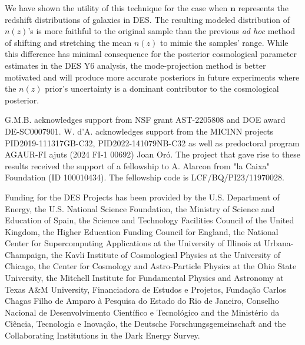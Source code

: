 \documentclass[linenumbers, onecolumn]{aastex63}
\newcommand{\vecn}{\ensuremath{\mathbf{n}}}
\begin{document}
  We have shown the utility of this technique for the case when
  $\vecn$ represents the redshift distributions of galaxies in DES.
  The resulting modeled distribution of $n(z)$'s is more faithful to
  the original sample than the previous \textit{ad hoc} method of
  shifting and stretching the mean $n(z)$ to mimic the samples'
  range.  While this difference has minimal consequence for the
  posterior cosmological parameter estimates in the DES Y6 analysis,
  the mode-projection method is better motivated and will produce more
  accurate posteriors in future experiments where the $n(z)$
  prior's uncertainty is a dominant contributor to the cosmological posterior.


  \begin{acknowledgments}
G.M.B. acknowledges support from NSF grant AST-2205808 and DOE award DE-SC0007901.
W. d’A. acknowledges support from the  MICINN projects PID2019-111317GB-C32, PID2022-141079NB-C32 as well as predoctoral program AGAUR-FI ajuts (2024 FI-1 00692) Joan Or\'o.
The project that gave rise to these results received the support of a fellowship to A. Alarcon from "la Caixa" Foundation (ID 100010434). The fellowship code is LCF/BQ/PI23/11970028.

Funding for the DES Projects has been provided by the U.S. Department of Energy, the U.S. National Science Foundation, the Ministry of Science and Education of Spain, 
the Science and Technology Facilities Council of the United Kingdom, the Higher Education Funding Council for England, the National Center for Supercomputing 
Applications at the University of Illinois at Urbana-Champaign, the Kavli Institute of Cosmological Physics at the University of Chicago, 
the Center for Cosmology and Astro-Particle Physics at the Ohio State University,
the Mitchell Institute for Fundamental Physics and Astronomy at Texas A\&M University, Financiadora de Estudos e Projetos, 
Funda{\c c}{\~a}o Carlos Chagas Filho de Amparo {\`a} Pesquisa do Estado do Rio de Janeiro, Conselho Nacional de Desenvolvimento Cient{\'i}fico e Tecnol{\'o}gico and 
the Minist{\'e}rio da Ci{\^e}ncia, Tecnologia e Inova{\c c}{\~a}o, the Deutsche Forschungsgemeinschaft and the Collaborating Institutions in the Dark Energy Survey. 


\end{acknowledgments}
\end{document}
